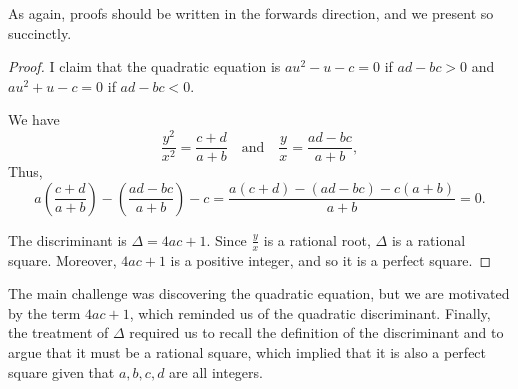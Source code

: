 \documentclass[../main.tex]{subfiles}
\begin{document}
As again, proofs should be written in the forwards direction, and we present so succinctly.
\begin{proof}
I claim that the quadratic equation is $au^2-u-c=0$ if $ad-bc > 0$ and $au^2+u-c=0$ if $ad-bc < 0$.

We have $$\frac{y^2}{x^2}=\frac{c+d}{a+b} \quad\text{and}\quad \frac{y}{x}=\frac{ad-bc}{a+b},$$
Thus, $$a\left(\frac{c+d}{a+b}\right)-\left(\frac{ad-bc}{a+b}\right)-c=\frac{a(c+d)-(ad-bc)-c(a+b)}{a+b}=0.$$

The discriminant is $\Delta=4ac+1$. Since $\frac{y}{x}$ is a rational root, $\Delta$ is a rational square. Moreover, $4ac+1$ is a positive integer, and so it is a perfect square.
\end{proof}
\begin{moral}
The main challenge was discovering the quadratic equation, but we are motivated by the term $4ac+1$, which reminded us of the quadratic discriminant. Finally, the treatment of $\Delta$ required us to recall the definition of the discriminant and to argue that it must be a rational square, which implied that it is also a perfect square given that $a,b,c,d$ are all integers.
\end{moral}
\end{document}
